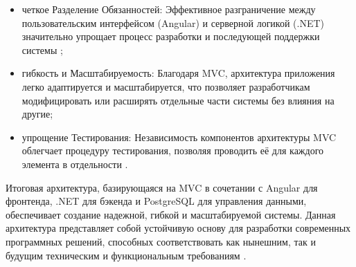 \begin{itemize}
  \item четкое Разделение Обязанностей: Эффективное разграничение между пользовательским интерфейсом (Angular) и серверной логикой (.NET) значительно упрощает процесс разработки и последующей поддержки системы \cite{kofman};
  \item гибкость и Масштабируемость: Благодаря MVC, архитектура приложения легко адаптируется и масштабируется, что позволяет разработчикам модифицировать или расширять отдельные части системы без влияния на другие;
  \item упрощение Тестирования: Независимость компонентов архитектуры MVC облегчает процедуру тестирования, позволяя проводить её для каждого элемента в отдельности \cite{kofman}.
\end{itemize}

Итоговая архитектура, базирующаяся на MVC в сочетании с Angular для фронтенда, .NET для бэкенда и PostgreSQL для управления данными, обеспечивает создание надежной, гибкой и масштабируемой системы. Данная архитектура представляет собой устойчивую основу для разработки современных программных решений, способных соответствовать как нынешним, так и будущим техническим и функциональным требованиям \cite{kofman}.
